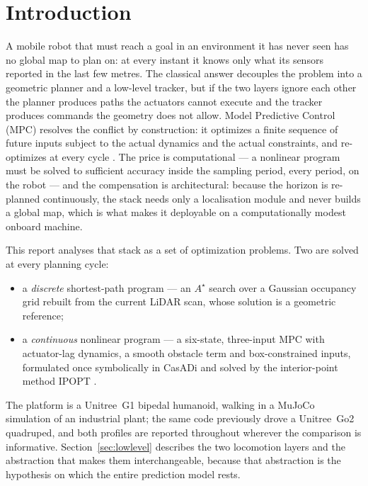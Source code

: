 \documentclass[11pt,a4paper]{article}
\newcommand{\astar}{$A^\star$}
\begin{document}


\tableofcontents
\vspace{10pt}

\section{Introduction}
\label{sec:intro}

A mobile robot that must reach a goal in an environment it has never seen has no global map to plan on: at
every instant it knows only what its sensors reported in the last few metres. The classical answer decouples
the problem into a geometric planner and a low-level tracker, but if the two layers ignore each other the
planner produces paths the actuators cannot execute and the tracker produces commands the geometry does not
allow. Model Predictive Control (MPC) resolves the conflict by construction: it optimizes a finite sequence
of future inputs subject to the actual dynamics and the actual constraints, and re-optimizes at every cycle
\cite{rawlings2017mpc}. The price is computational --- a nonlinear program must be solved to sufficient
accuracy inside the sampling period, every period, on the robot --- and the compensation is architectural:
because the horizon is re-planned continuously, the stack needs only a localisation module and never builds
a global map, which is what makes it deployable on a computationally modest onboard machine.

This report analyses that stack as a set of optimization problems. Two are solved at every planning cycle:

\begin{itemize}
  \item a \emph{discrete} shortest-path program --- an \astar{} search over a Gaussian occupancy grid rebuilt
        from the current LiDAR scan, whose solution is a geometric reference;
  \item a \emph{continuous} nonlinear program --- a six-state, three-input MPC with actuator-lag dynamics, a
        smooth obstacle term and box-constrained inputs, formulated once symbolically in CasADi
        \cite{andersson2019casadi} and solved by the interior-point method IPOPT \cite{wachter2006ipopt}.
\end{itemize}

The platform is a Unitree~G1 bipedal humanoid, walking in a MuJoCo simulation of an industrial plant; the same
code previously drove a Unitree~Go2 quadruped, and both profiles are reported throughout wherever the
comparison is informative. Section~\ref{sec:lowlevel} describes the two locomotion layers and the abstraction
that makes them interchangeable, because that abstraction is the hypothesis on which the entire prediction
model rests.
\end{document}
